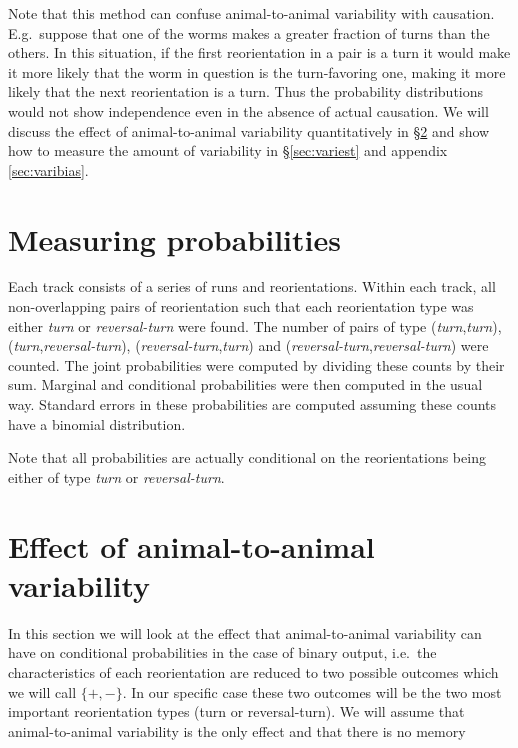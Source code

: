 \documentclass[12pt]{article}
\newcommand{\sref}[1]{\S\ref{#1}}
\newcommand{\Eg}{E.g.\ }
\newcommand{\ie}{i.e.\ }
\begin{document}
Note that this method can confuse animal-to-animal variability with causation. \Eg suppose that one of the worms makes a greater fraction of turns than the others. In this situation, if the first reorientation in a pair is a turn it would make it more likely that the worm in question is the turn-favoring one, making it more likely that the next reorientation is a turn. Thus the probability distributions would not show independence even in the absence of actual causation. We will discuss the effect of animal-to-animal variability quantitatively in \sref{sec:variability} and show how to measure the amount of variability in \sref{sec:variest} and appendix \ref{sec:varibias}.

\section{Measuring probabilities}\label{sec:measureprobs}

Each track consists of a series of runs and reorientations. Within each track, all non-overlapping pairs of reorientation such that each reorientation type was either \emph{turn} or \emph{reversal-turn} were found. The number of pairs of type (\emph{turn},\emph{turn}), (\emph{turn},\emph{reversal-turn}), (\emph{reversal-turn},\emph{turn}) and (\emph{reversal-turn},\emph{reversal-turn}) were counted. The joint probabilities were computed by dividing these counts by their sum. Marginal and conditional probabilities were then computed in the usual way. Standard errors in these probabilities are computed assuming these counts have a binomial distribution.

Note that all probabilities are actually conditional on the reorientations being either of type \emph{turn} or \emph{reversal-turn}.

\section{Effect of animal-to-animal variability}\label{sec:variability}

In this section we will look at the effect that animal-to-animal variability can have on conditional probabilities in the case of binary output, \ie the characteristics of each reorientation are reduced to two possible outcomes which we will call $\{+,-\}$. In our specific case these two outcomes will be the two most important reorientation types (turn or reversal-turn). We will assume that animal-to-animal variability is the only effect and that there is no memory
\end{document}
